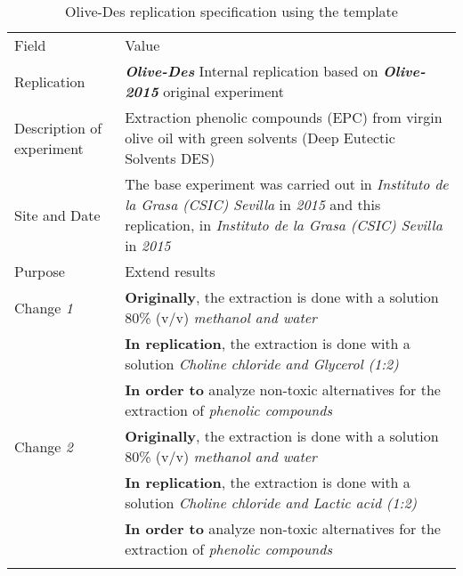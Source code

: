 \begin{table*}[h]
  \caption{Olive-Des replication specification using the template}
\label{tab:Arantxa}
  \centering

\begin{tabularx}{\textwidth}{
  >{\hsize=0.25\hsize}X
  >{\hsize=0.8\hsize}X}
  
    \noalign{\smallskip}\hline\noalign{\smallskip}
  
  Field &  Value  \\ 
  \noalign{\smallskip}\hline\noalign{\smallskip}
 
 Replication &   \textbf{\emph{Olive-Des}}   Internal replication based on \textbf{\emph{Olive-2015}}  original experiment   \\

 Description \newline of experiment &  Extraction phenolic compounds (EPC) from virgin olive oil with green solvents (Deep Eutectic Solvents DES) \\  

 Site and Date & The base experiment was carried out in  \textit{Instituto de la Grasa (CSIC) Sevilla}  in  \textit{2015} and this replication, in  \textit{Instituto de la Grasa (CSIC) Sevilla} in \textit{2015}    \\
    Purpose  &  Extend results \\  
\hline   
    Change \textit{1}   & \textbf{Originally}, the extraction is done with a solution 80\% (v/v) \emph{methanol and water}  \\& \textbf{In replication}, the extraction is done with a solution \emph{Choline chloride and Glycerol (1:2)}  \\& \textbf{In order to} analyze non-toxic alternatives for the extraction of \emph{phenolic compounds}   \\ 	
   	\noalign{\smallskip\smallskip}\hline

    Change \textit{2}   & \textbf{Originally}, the extraction is done with a solution 80\% (v/v) \emph{methanol and water}  \\& \textbf{In replication}, the extraction is done with a solution \emph{Choline chloride and Lactic acid (1:2)}  \\& \textbf{In order to} analyze non-toxic alternatives for the extraction of \emph{phenolic compounds}   \\ 
    \noalign{\smallskip\smallskip}\hline   	


\end{tabularx}
\end{table*}
